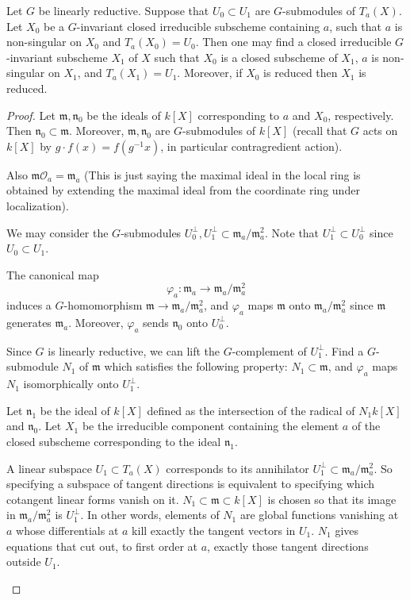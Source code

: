 \documentclass[12pt]{article}
\begin{document}
\begin{theorem}[2.1]
Let $G$ be linearly reductive. Suppose that $U_0 \subset U_1$ are $G$-submodules of $T_a(X)$.  
Let $X_0$ be a $G$-invariant closed irreducible subscheme containing $a$, such that $a$ is non-singular on $X_0$ and $T_a(X_0) = U_0$.  
Then one may find a closed irreducible $G$-invariant subscheme $X_1$ of $X$ such that $X_0$ is a closed subscheme of $X_1$, $a$ is non-singular on $X_1$, and $T_a(X_1) = U_1$.  
Moreover, if $X_0$ is reduced then $X_1$ is reduced.
\end{theorem}

\begin{proof}
Let $\mathfrak{m}, \mathfrak{n}_0$ be the ideals of $k[X]$ corresponding to $a$ and $X_0$, respectively.  
Then $\mathfrak{n}_0 \subset \mathfrak{m}$. Moreover, $\mathfrak{m}, \mathfrak{n}_0$ are $G$-submodules of $k[X]$ (recall that $G$ acts on $k[X]$ by $g\cdot f(x) = f(g^{-1}x)$, in particular contragredient action).

Also $\mathfrak{m}\mathcal{O}_a = \mathfrak{m}_a$ (This is just saying the maximal ideal in the local ring is obtained by extending the maximal ideal from the coordinate ring under localization).

We may consider the $G$-submodules $U_0^\perp, U_1^\perp \subset \mathfrak{m}_a / \mathfrak{m}_a^2$. Note that $U_1^\perp \subset U_0^\perp$ since $U_0 \subset U_1$.

The canonical map
\[
   \varphi_a : \mathfrak{m}_a \longrightarrow \mathfrak{m}_a / \mathfrak{m}_a^2
\]
induces a $G$-homomorphism $\mathfrak{m} \to \mathfrak{m}_a / \mathfrak{m}_a^2$, and $\varphi_a$ maps $\mathfrak{m}$ onto $\mathfrak{m}_a / \mathfrak{m}_a^2$ since $\mathfrak{m}$ generates $\mathfrak{m}_a$.  
Moreover, $\varphi_a$ sends $\mathfrak{n}_0$ onto $U_0^\perp$.  

Since $G$ is linearly reductive, we can lift the $G$-complement of $U_1^\perp$. Find a $G$-submodule $N_1$ of $\mathfrak{m}$ which satisfies the following property: $N_1 \subset \mathfrak{m}$, and $\varphi_a$ maps $N_1$ isomorphically onto $U_1^\perp$.  

Let $\mathfrak{n}_1$ be the ideal of $k[X]$ defined as the intersection of the radical of $N_1k[X]$ and $\mathfrak{n}_0$.  
Let $X_1$ be the irreducible component containing the element $a$ of the closed subscheme corresponding to the ideal $\mathfrak{n}_1$.  

\begin{remark}
A linear subspace $U_1 \subset T_a(X)$ corresponds to its annihilator $U_1^\perp \subset \mathfrak{m}_a/\mathfrak{m}_a^2$. So specifying a subspace of tangent directions is equivalent to specifying which cotangent linear forms vanish on it. $N_1 \subset \mathfrak{m} \subset k[X]$ is chosen so that its image in $\mathfrak{m}_a/\mathfrak{m}_a^2$ is $U_1^\perp$. In other words, elements of $N_1$ are global functions vanishing at $a$ whose differentials at $a$ kill exactly the tangent vectors in $U_1$. $N_1$ gives equations that cut out, to first order at $a$, exactly those tangent directions outside $U_1$.


\end{remark}
\end{proof}
\end{document}
